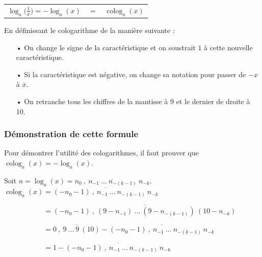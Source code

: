 \documentclass[a4paper]{article}
\begin{document}
\begin{center}
\begin{tabular}{ccl}

	$ \log_a \Big( \frac{1}{x} \Big) = - \log_a (x) $ & $ = $ & $\operatorname{colog}_a (x) $ \\
	
\end{tabular}
\end{center}

En définissant le cologarithme de la manière suivante :
\begin{itemize}
	\item[•] On change le signe de la caractéristique et on soustrait $1$ à cette nouvelle caractéristique.
	\item[•] Si la caractéristique est négative, on change sa notation pour passer de $-x$ à $\overline{x}$. 
	\item[•] On retranche tous les chiffres de la mantisse à 9 et le dernier de droite à 10.
\end{itemize}

\vspace{2 mm}

\subsubsection*{Démonstration de cette formule}

Pour démontrer l'utilité des cologarithmes, il faut prouver que $\operatorname{colog}_a (x) = -\log_a(x)$.

Soit $n = \log_a(x) = \overline{n_{0}~,~n_{-1}~\dots~n_{-(k-1)}~n_{-k}}$.\\

$\operatorname{colog}_a (x) = \overline{(-n_{0}-1)~,~n_{-1}~\dots~n_{-(k-1)}~n_{-k}}$

\vspace{2 mm}

$\phantom{\operatorname{colog}_a (x)} = \overline{(-n_{0}-1)~,~(9-n_{-1})~\dots~(9-n_{-(k-1)})~(10-n_{-k})}$

\vspace{2 mm}

$\phantom{\operatorname{colog}_a (x)} = \overline{0~,~9~\dots~9~(10)} - \overline{(-n_{0}-1)~,~n_{-1}~\dots~n_{-(k-1)}~
n_{-k}}  $

\vspace{2 mm}

$\phantom{\operatorname{colog}_a (x)} = 1 - \overline{(-n_{0}-1)~,~n_{-1}~\dots~n_{-(k-1)}~
n_{-k}}  $\\
\end{document}
